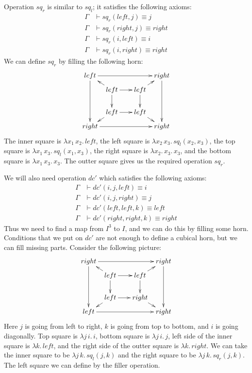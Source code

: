 \documentclass[reqno]{amsart}
\theoremstyle{definition}
\theoremstyle{remark}
\newcommand{\deq}{\equiv}
\numberwithin{figure}{section}
\begin{document}
Operation $sq_r$ is similar to $sq_l$; it satisfies the following axioms:
\begin{align*}
\Gamma & \vdash sq_r(left,j) \deq j \\
\Gamma & \vdash sq_r(right,j) \deq right \\
\Gamma & \vdash sq_r(i,left) \deq i \\
\Gamma & \vdash sq_r(i,right) \deq right
\end{align*}
We can define $sq_r$ by filling the following horn:
\[ \xymatrix @C=0.5pc @R=0.5pc
    { left \ar[rrrr] \ar[dddd] &          & &                      & right \ar[dddd] \\
           & left \ar[rr] \ar[dd] \ar[ul] & & left \ar[dd] \ar[ur] & \\
           &                              & &                      & \\
           & left \ar[rr] \ar[dl]         & & left \ar[dr]         & \\
      right \ar[rrrr]           &         & &                      & right
    }\]
The inner square is $\lambda x_1\,x_2.\,left$, the left square is $\lambda x_2\,x_3.\,sq_l(x_2,x_3)$,
the top square is $\lambda x_1\,x_3.\,sq_l(x_1,x_3)$, the right square is $\lambda x_2.\,x_3.\,x_3$,
and the bottom square is $\lambda x_1\,x_3.\,x_3$.
The outter square gives us the required operation $sq_r$.

We will also need operation $dc'$ which satisfies the following axioms:
\begin{align*}
\Gamma & \vdash dc'(i,j,left) \deq i \\
\Gamma & \vdash dc'(i,j,right) \deq j \\
\Gamma & \vdash dc'(left,left,k) \deq left \\
\Gamma & \vdash dc'(right,right,k) \deq right
\end{align*}
Thus we need to find a map from $I^3$ to $I$, and we can do this by filling some horn.
Conditions that we put on $dc'$ are not enough to define a cubical horn, but we can fill missing parts.
Consider the following picture:
\[ \xymatrix @C=0.5pc @R=0.5pc
    { right \ar[rrrr] \ar[dddd] &         & &                      & right \ar[dddd] \\
           & left \ar[rr] \ar[dd] \ar[ul] & & left \ar[dd] \ar[ur] & \\
           &                              & &                      & \\
           & left \ar[rr] \ar[dl]         & & right \ar[dr]        & \\
      left \ar[rrrr]           &          & &                      & right
    }\]
Here $j$ is going from left to right, $k$ is going from top to bottom, and $i$ is going diagonally.
Top square is $\lambda j\,i.\,i$, bottom square is $\lambda j\,i.\,j$, left side of the inner square is $\lambda k.\,left$,
and the right side of the outter square is $\lambda k.\,right$.
We can take the inner square to be $\lambda j\,k.\,sq_l(j,k)$ and the right square to be $\lambda j\,k.\,sq_r(j,k)$.
The left square we can define by the filler operation.
\end{document}
